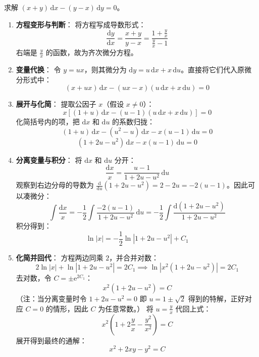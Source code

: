 \documentclass[lang=cn,11pt]{elegantbook}
\begin{document}
\begin{exercise}
求解 $(x+y)\,\mathrm{d}x-(y-x)\,\mathrm{d}y=0$。
\end{exercise}
\begin{solution}
\begin{enumerate}
    \item \textbf{方程变形与判断}：
    将方程写成导数形式：
    \[
    \frac{\mathrm{d}y}{\mathrm{d}x} = \frac{x+y}{y-x} = \frac{1 + \frac{y}{x}}{\frac{y}{x} - 1}
    \]
    右端是 $\frac{y}{x}$ 的函数，故为齐次微分方程。
    \item \textbf{变量代换}：
    令 $y=ux$，则其微分为 $\mathrm{d}y=u\,\mathrm{d}x+x\,\mathrm{d}u$。直接将它们代入原微分形式中：
    \[
    (x+ux)\,\mathrm{d}x - (ux-x)(u\,\mathrm{d}x+x\,\mathrm{d}u) = 0
    \]
    \item \textbf{展开与化简}：
    提取公因子 $x$（假设 $x \neq 0$）：
    \[
    x\left[ (1+u)\,\mathrm{d}x - (u-1)(u\,\mathrm{d}x+x\,\mathrm{d}u) \right] = 0
    \]
    化简括号内的项，把 $\mathrm{d}x$ 和 $\mathrm{d}u$ 的系数归拢：
    \[
    (1+u)\,\mathrm{d}x - (u^2-u)\,\mathrm{d}x - x(u-1)\,\mathrm{d}u = 0
    \]
    \[
    (1 + 2u - u^2)\,\mathrm{d}x - x(u-1)\,\mathrm{d}u = 0
    \]
    \item \textbf{分离变量与积分}：
    将 $\mathrm{d}x$ 和 $\mathrm{d}u$ 分开：
    \[
    \frac{\mathrm{d}x}{x} = \frac{u-1}{1+2u-u^2}\,\mathrm{d}u
    \]
    观察到右边分母的导数为 $\frac{\mathrm{d}}{\mathrm{d}u}(1+2u-u^2) = 2-2u = -2(u-1)$。因此可以凑微分：
    \[
    \int \frac{\mathrm{d}x}{x} = -\frac{1}{2} \int \frac{-2(u-1)}{1+2u-u^2}\,\mathrm{d}u = -\frac{1}{2} \int \frac{\mathrm{d}(1+2u-u^2)}{1+2u-u^2}
    \]
    积分得到：
    \[
    \ln|x| = -\frac{1}{2}\ln|1+2u-u^2| + C_1
    \]
    \item \textbf{化简并回代}：
    方程两边同乘 $2$，并合并对数：
    \[
    2\ln|x| + \ln|1+2u-u^2| = 2C_1 \implies \ln\left| x^2(1+2u-u^2) \right| = 2C_1
    \]
    去对数，令 $C = \pm\mathrm{e}^{2C_1}$：
    \[
    x^2(1+2u-u^2) = C
    \]
    （注：当分离变量时令 $1+2u-u^2=0$ 即 $u=1\pm\sqrt{2}$ 得到的特解，正好对应 $C=0$ 的情形，因此 $C$ 为任意常数。）
    将 $u=\frac{y}{x}$ 代回上式：
    \[
    x^2\left(1 + 2\frac{y}{x} - \frac{y^2}{x^2}\right) = C
    \]
    展开得到最终的通解：
    \[
    \boxed{x^2+2xy-y^2=C}
    \]
\end{enumerate}
\end{solution}
\end{document}
